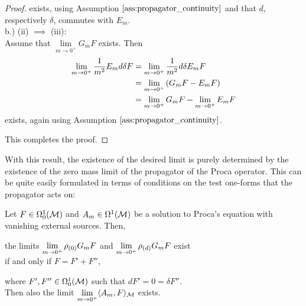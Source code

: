 \begin{proof}
	exists, using Assumption $\ref{ass:propagator_continuity}$ and that $d$, respectively $\delta$, commutes with $E_m$.\\
	b.) (ii) $\implies$ (iii):\\ Assume that $\lim\limits_{m \to 0^+} G_m F  $ exists. Then
	\begin{align}
		\lim\limits_{m \to 0^+} \frac{1}{m^2}E_m d \delta  F
		&= \lim\limits_{m \to 0^+} \frac{1}{m^2}d \delta E_m   F \notag \\
		&= \lim\limits_{m \to 0^+} \left( G_m F - E_m F \right) \notag \\
		&= \lim\limits_{m \to 0^+}  G_m F - \lim\limits_{m \to 0^+}  E_m F
	\end{align}
	exists, again using Assumption $\ref{ass:propagator_continuity}$.\par This completes the proof.
\end{proof}
%
%
%
With this result, the existence of the desired limit is purely determined by the existence of the zero mass limit of the propagator of the Proca operator. This can be quite easily formulated in terms of conditions on the test one-forms that the propagator acts on:
\begin{lemma}\label{lem:mass-zero-limit-existence-classical_weak}
	Let $F\in \Omega^1_0(\mathcal{M})$ and $A_m \in \Omega^1(\mathcal{M})$ be a solution to Proca's equation with vanishing external sources. Then,
	\begin{center}
		the limits $\lim\limits_{m \to 0^+} \rho_{(0)} G_m F$ and  $\lim\limits_{m \to 0^+} \rho_{(d)} G_m F$ exist\\ if and only if $F = F' + F''$,\\
	\end{center}
	where $F', F'' \in \Omega^1_0(\mathcal{M})$ such that $dF' = 0 = \delta F''$.\\
	Then also the limit $\lim\limits_{m \to 0^+} \langle A_m , F \rangle_{\mathcal{M}}$ exists.
\end{lemma}
